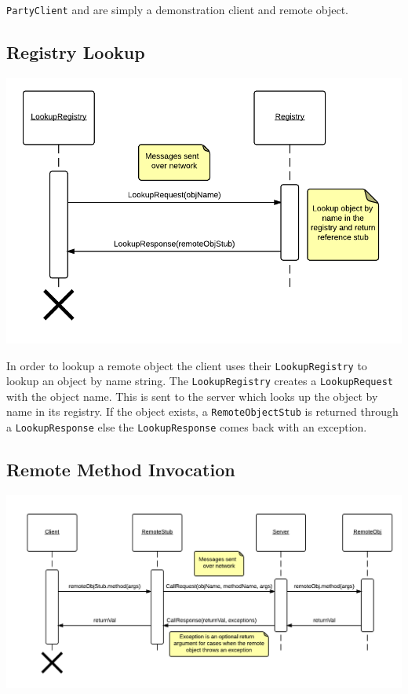 \documentclass[12pt]{article}
\begin{document}
\texttt{PartyClient} and  are simply a demonstration client and remote object.

\subsection*{Registry Lookup}

\includegraphics[scale=.4]{Lookup.png}

In order to lookup a remote object the client uses their \texttt{LookupRegistry} to lookup an object by name string. The \texttt{LookupRegistry} creates a \texttt{LookupRequest} with the object name. This is sent to the server which looks up the object by name in its registry. If the object exists, a \texttt{RemoteObjectStub} is returned through a \texttt{LookupResponse} else the \texttt{LookupResponse} comes back with an exception.

\subsection*{Remote Method Invocation}

\includegraphics[scale=.3]{callMethod.png}
\end{document}
